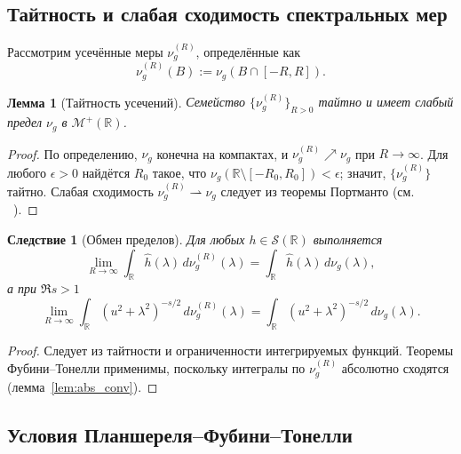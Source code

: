\documentclass{article}
\numberwithin{equation}{section}
\theoremstyle{plain}
\newtheorem{lemma}{Лемма}
\newtheorem{corollary}{Следствие}
\theoremstyle{definition}
\theoremstyle{remark}
\def\infty{∞}\def\partial{∂}\def\sum{Σ}\def\int{∫}%
\begin{document}
\subsection{Тайтность и слабая сходимость спектральных мер}
\label{subsec:tightness}

Рассмотрим усечённые меры $\nu_g^{(R)}$, определённые как
\begin{equation}
\label{eq:nu_trunc}
\nu_g^{(R)}(B):=\nu_g(B\cap[-R,R]).
\end{equation}

\begin{lemma}[Тайтность усечений]
\label{lem:tightness}
Семейство $\{\nu_g^{(R)}\}_{R>0}$ тайтно и имеет слабый предел $\nu_g$ в $\mathcal M^+(\mathbb R)$.
\end{lemma}

\begin{proof}
По определению, $\nu_g$ конечна на компактах, и $\nu_g^{(R)}\nearrow\nu_g$ при $R\to\infty$.
Для любого $\epsilon>0$ найдётся $R_0$ такое, что $\nu_g(\mathbb R\setminus[-R_0,R_0])<\epsilon$;
значит, $\{\nu_g^{(R)}\}$ тайтно. Слабая сходимость $\nu_g^{(R)}\rightharpoonup\nu_g$
следует из теоремы Портманто (см.~\cite{Billingsley1999} ~\cite{Parthasarathy1967}).
\end{proof}

\begin{corollary}[Обмен пределов]
\label{cor:limit_exchange}
Для любых $h\in\mathcal S(\mathbb R)$ выполняется
\begin{equation}
\label{eq:exchange}
\lim_{R\to\infty}\int_{\mathbb R}\widehat h(\lambda)\,d\nu_g^{(R)}(\lambda)
=\int_{\mathbb R}\widehat h(\lambda)\,d\nu_g(\lambda),
\end{equation}
а при $\Re s>1$
\begin{equation}
\label{eq:exchange_mellin}
\lim_{R\to\infty}\int_{\mathbb R}(u^2+\lambda^2)^{-s/2}\,d\nu_g^{(R)}(\lambda)
=\int_{\mathbb R}(u^2+\lambda^2)^{-s/2}\,d\nu_g(\lambda).
\end{equation}
\end{corollary}

\begin{proof}
Следует из тайтности и ограниченности интегрируемых функций.
Теоремы Фубини–Тонелли применимы, поскольку интегралы по $\nu_g^{(R)}$
абсолютно сходятся (лемма~\ref{lem:abs_conv}).
\end{proof}

\subsection{Условия Планшереля–Фубини–Тонелли}
\label{subsec:Fubini_Tonelli}
\end{document}
